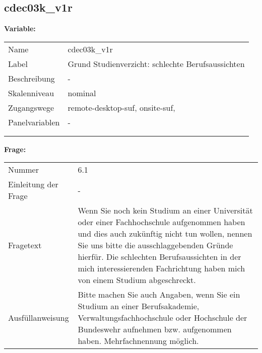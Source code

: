 	
	
	\subsection{cdec03k\_v1r}
	\label{subSection:cdec03k_v1r}

	\noindent\textbf{Variable:}\\
		\begin{tabular}{lL{11.3cm}}
			\label{tableVariable:cdec03k_v1r}
			Name & cdec03k\_v1r \\
			Label & Grund Studienverzicht: schlechte Berufsaussichten \\
			Beschreibung & - \\
			Skalenniveau & nominal \\
			Zugangswege &
				remote-desktop-suf,
				onsite-suf,
 \\
			Panelvariablen & -
			 \\
			 \\
 \\
		\end{tabular}

		\vspace*{1 cm}
		\noindent\textbf{Frage:}\\
		\begin{tabular}{lL{11.3cm}}
			\label{tableQuestion:cdec03k_v1r}
			Nummer & 6.1 \\
			Einleitung der Frage & - \\
			Fragetext & Wenn Sie noch kein Studium an einer Universität oder einer Fachhochschule aufgenommen haben und dies auch zukünftig nicht tun wollen, nennen Sie uns bitte die ausschlaggebenden Gründe hierfür.
Die schlechten Berufsaussichten in der mich interessierenden Fachrichtung haben mich von einem Studium abgeschreckt. \\
			Ausfüllanweisung & Bitte machen Sie auch Angaben, wenn Sie ein Studium an einer Berufsakademie, Verwaltungsfachhochschule oder Hochschule der Bundeswehr aufnehmen bzw. aufgenommen haben. Mehrfachnennung möglich. \\
		\end{tabular}





